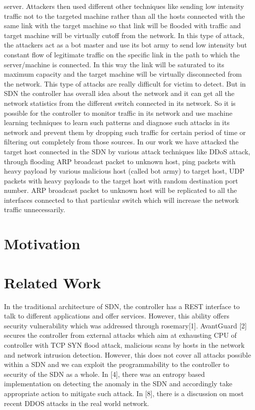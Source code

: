\documentclass[conference]{IEEEtran}
\begin{document}
server. Attackers then used different other techniques like sending low intensity traffic not to the targeted machine rather than all the hosts connected with the same link with the target machine so that link will be flooded with traffic and target machine will be virtually cutoff from the network. In this type of attack, the attackers act as a bot master and use its bot army to send low intensity but constant flow of legitimate traffic on the specific link in the path to which the
server/machine is connected. In this way the link will be saturated to its maximum capacity and the target machine will be virtually disconnected from the network. This type of attacks are really difficult for victim to detect. But in SDN the controller has overall idea about the network and it can get all the network statistics from the different switch connected in its network. So it is possible for the controller to monitor traffic in its network and use machine learning techniques
to learn such patterns and diagnose such attacks in its network and prevent them by dropping such traffic for certain period of time or filtering out completely from those sources. In our work we have attacked the target host connected in the SDN by various attack techniques like DDoS attack, through flooding ARP broadcast packet to unknown host, ping packets with heavy payload by various malicious host (called bot army) to target host, UDP packets with heavy payloads to the target host with random destination port number. ARP broadcast packet to unknown host will be replicated to all the interfaces connected to that particular switch which will increase the network traffic unnecessarily.




\section{\textbf{Motivation}}




\section{\textbf{Related Work}}
In the traditional architecture of SDN, the controller has a REST interface to talk to different applications and offer services. However, this ability offers security vulnerability which was addressed through rosemary[1]. AvantGuard [2] secures the controller from external attacks which aim at exhausting CPU of controller with TCP SYN flood attack, malicious scans by hosts in the network and network intrusion detection. However, this does not cover all attacks possible within a SDN and we can exploit the programmability to the controller to security of the SDN as a whole. In [4], there was an entropy based implementation on detecting the anomaly in the SDN and accordingly take appropriate action to mitigate such attack. In [8], there is a discussion on most recent DDOS attacks in the real world network.
\end{document}
